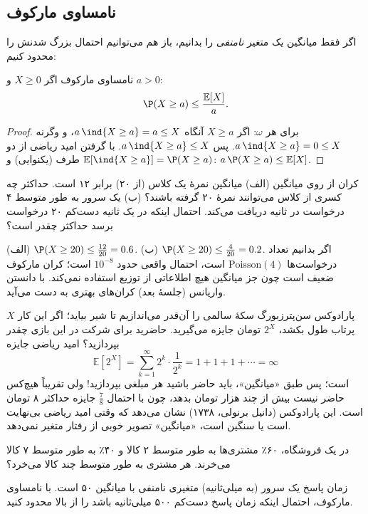 \subsection{نامساوی مارکوف}

اگر فقط میانگین یک متغیر \emph{نامنفی} را بدانیم، باز هم می‌توانیم احتمال بزرگ شدنش را محدود کنیم:

\begin{theorem}[label=thm:markov]{نامساوی مارکوف}
اگر $X\ge0$ و $a>0$:
\[ \P(X\ge a)\le\frac{\mathbb E[X]}{a}. \]
\end{theorem}

\begin{proof}
برای هر $\omega$: اگر $X\ge a$ آنگاه $a\,\ind\{X\ge a\}=a\le X$، و وگرنه $a\,\ind\{X\ge a\}=0\le X$. پس $a\,\ind\{X\ge a\}\le X$. با گرفتن امید ریاضی از دو طرف (یکنوایی) و $\mathbb E[\ind\{X\ge a\}]=\P(X\ge a)$:
$a\,\P(X\ge a)\le\mathbb E[X]$.
\end{proof}

\begin{example}[label=ex:markov]{کران از روی میانگین}
(الف) میانگین نمرهٔ یک کلاس (از ۲۰) برابر ۱۲ است. حداکثر چه کسری از کلاس می‌توانند نمرهٔ ۲۰ گرفته باشند؟ (ب) یک سرور به طور متوسط ۴ درخواست در ثانیه دریافت می‌کند. احتمال اینکه در یک ثانیه دست‌کم ۲۰ درخواست برسد حداکثر چقدر است؟
\begin{solution}
(الف) $\P(X\ge20)\le\frac{12}{20}=0.6$. (ب) $\P(X\ge20)\le\frac4{20}=0.2$. اگر بدانیم تعداد درخواست‌ها $\mathrm{Poisson}(4)$ است، احتمال واقعی حدود $10^{-8}$ است؛ کران مارکوف ضعیف است چون جز میانگین هیچ اطلاعاتی از توزیع استفاده نمی‌کند. با دانستن واریانس (جلسهٔ بعد) کران‌های بهتری به دست می‌آید.
\end{solution}
\end{example}

\begin{moreinfo}{پارادوکس سن‌پترزبورگ}
سکهٔ سالمی را آن‌قدر می‌اندازیم تا شیر بیاید؛ اگر این کار $X$ پرتاب طول بکشد، $2^X$ تومان جایزه می‌گیرید. حاضرید برای شرکت در این بازی چقدر بپردازید؟ امید ریاضی جایزه
\[ \mathbb E[2^X]=\sum_{k=1}^{\infty}2^k\cdot\frac1{2^k}=1+1+1+\cdots=\infty \]
است؛ پس طبق «میانگین»، باید حاضر باشید هر مبلغی بپردازید! ولی تقریباً هیچ‌کس حاضر نیست بیش از چند هزار تومان بدهد، چون با احتمال $\tfrac78$ جایزه حداکثر ۸ تومان است. این پارادوکس (دانیل برنولی، ۱۷۳۸) نشان می‌دهد که وقتی امید ریاضی بی‌نهایت است یا  سنگین است، «میانگین» تصویر خوبی از رفتار متغیر نمی‌دهد.
\end{moreinfo}


\begin{exercise}
در یک فروشگاه، ۶۰٪ مشتری‌ها به طور متوسط ۲ کالا و ۴۰٪ به طور متوسط ۷ کالا می‌خرند. هر مشتری به طور متوسط چند کالا می‌خرد؟
\end{exercise}

\begin{exercise}
زمان پاسخ یک سرور (به میلی‌ثانیه) متغیری نامنفی با میانگین ۵۰ است. با نامساوی مارکوف، احتمال اینکه زمان پاسخ دست‌کم ۵۰۰ میلی‌ثانیه باشد را از بالا محدود کنید.
\end{exercise}
